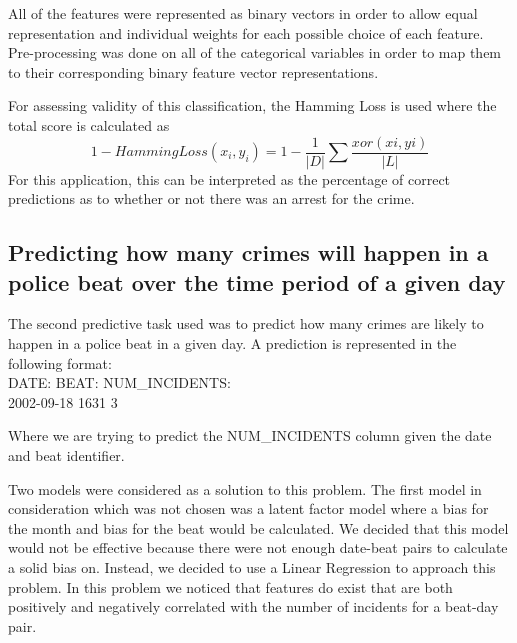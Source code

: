 \documentclass[journal]{IEEEtran}
\begin{document}
\begin{enumerate}
All of the features were represented as binary vectors in order to allow equal representation and individual weights for each possible choice of each feature. Pre-processing was done on all of the categorical variables in order to map them to their corresponding binary feature vector representations. 

For assessing validity of this classification, the Hamming Loss is used where the total score is calculated as 
            $$1-HammingLoss(x_i,y_i)= 1 - \frac{1}{|D|}\sum \frac{xor(xi,yi)}{|L|}$$
For this application, this can be interpreted as the percentage of correct predictions as to whether or not there was an arrest for the crime.
\end{enumerate}

\subsection{\textbf{Predicting how many crimes will happen in a police beat over the time period of a given day}}
The second predictive task used was to predict how many crimes are likely to happen in a police beat in a given day. 
A prediction is represented in the following format:\\
DATE: \hspace{1cm}	BEAT: \hspace{1cm} NUM\_INCIDENTS: \\
2002-09-18 \hspace{0.5cm}	 1631 \hspace{1cm}	 3

Where we are trying to predict the NUM\_INCIDENTS column given the date and beat identifier. 

Two models were considered as a solution to this problem. The first model in consideration which was not chosen was a latent factor model where a bias for the month and bias for the beat would be calculated. We decided that this model would not be effective because there were not enough date-beat pairs to calculate a solid bias on. 
Instead, we decided to use a Linear Regression to approach this problem. In this problem we noticed that features do exist that are both positively and negatively correlated with the number of incidents for a beat-day pair. 
\end{document}
